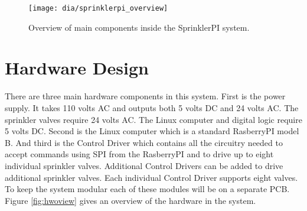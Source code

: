 \documentclass{article}
\begin{document}
\begin{figure}[h!]
\begin{center}
\texttt{[image: dia/sprinklerpi\_overview]}
\end{center}
\caption{Overview of main components inside the SprinklerPI system.}
\label{fig:spioview}
\end{figure}


\clearpage
\section{Hardware Design}
\label{sec:hardware}

There are three main hardware components in this system.
First is the power supply.
It takes 110 volts AC and outputs both 5 volts DC and 24 volts AC.
The sprinkler valves require 24 volts AC.
The Linux computer and digital logic require 5 volts DC.
Second is the Linux computer which is a standard RasberryPI model B.
And third is the Control Driver which contains all the
circuitry needed to accept commands using SPI from the RasberryPI
and to drive up to eight individual sprinkler valves.
Additional Control Drivers can be added to drive additional sprinkler
valves.
Each individual Control Driver supports eight valves.
To keep the system modular each of these modules will be on a
separate PCB.
Figure \ref{fig:hwoview} gives an overview of the hardware in the system.
\end{document}
